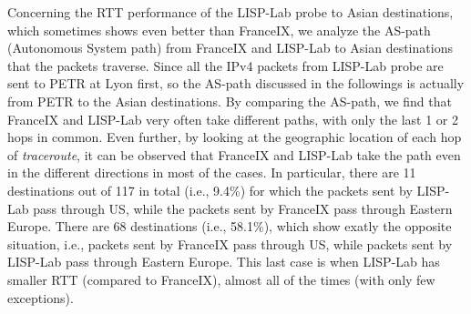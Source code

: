 Concerning the RTT performance of the LISP-Lab probe to Asian destinations, which sometimes shows even better than FranceIX, we analyze the AS-path (Autonomous System path) from FranceIX and LISP-Lab to Asian destinations that the packets traverse. Since all the IPv4 packets from LISP-Lab probe are sent to PETR at Lyon first, so the AS-path discussed in the followings is actually from PETR to the Asian destinations. By comparing the AS-path, we find that FranceIX and LISP-Lab very often take different paths, with only the last 1 or 2 hops in common. Even further, by looking at the geographic location of each hop of \emph{traceroute}, it can be observed that FranceIX and LISP-Lab take the path even in the different directions in most of the cases. In particular, there are 11 destinations out of 117 in total (i.e., 9.4\%) for which the packets sent by LISP-Lab pass through US, while the packets sent by FranceIX pass through Eastern Europe. There are 68 destinations (i.e., 58.1\%), which show exatly the opposite situation, i.e., packets sent by FranceIX pass through US, while packets sent by LISP-Lab pass through Eastern Europe. This last case is when LISP-Lab has smaller RTT (compared to FranceIX), almost all of the times (with only few exceptions). 

